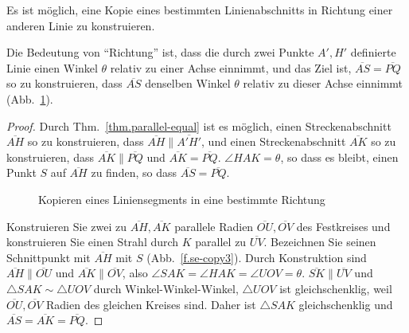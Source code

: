 \begin{theorem}\label{thm.straight-direction}
Es ist möglich, eine Kopie eines bestimmten Linienabschnitts in Richtung einer anderen Linie zu konstruieren.
\end{theorem}

Die Bedeutung von ``Richtung'' ist, dass die durch zwei Punkte $A',H'$ definierte Linie einen Winkel $\theta$ relativ zu einer Achse einnimmt, und das Ziel ist, $\overline{AS}=\overline{PQ}$ so zu konstruieren, dass $\overline{AS}$ denselben Winkel $\theta$ relativ zu dieser Achse einnimmt (Abb.~\ref{f.se-copy1}).

\begin{proof}
Durch Thm.~\ref{thm.parallel-equal} ist es möglich, einen Streckenabschnitt $\overline{AH}$ so zu konstruieren, dass $\overline{AH}\parallel\overline{A'H'}$, und einen Streckenabschnitt $\overline{AK}$ so zu konstruieren, dass $\overline{AK}\parallel\overline{PQ}$ und $\overline{AK}=\overline{PQ}$.
$\angle HAK=\theta$, so dass es bleibt, einen Punkt $S$ auf $\overline{AH}$ zu finden, so dass $\overline{AS}=\overline{PQ}$.

\begin{figure}[b]
\begin{center}
\end{center}
\caption{Kopieren eines Liniensegments in eine bestimmte Richtung}\label{f.se-copy1}
\end{figure}

Konstruieren Sie zwei zu $\overline{AH}, \overline{AK}$ parallele Radien $\overline{OU}, \overline{OV}$ des Festkreises und konstruieren Sie einen Strahl durch $K$ parallel zu $\overline{UV}$. Bezeichnen Sie seinen Schnittpunkt mit $\overline{AH}$ mit $S$ (Abb.~\ref{f.se-copy3}). Durch Konstruktion sind $\overline{AH}\parallel\overline{OU}$ und $\overline{AK}\parallel\overline{OV}$, also $\angle SAK=\angle HAK=\angle UOV=\theta$. $\overline{SK}\parallel\overline{UV}$ und $\triangle SAK\sim\triangle UOV$ durch Winkel-Winkel-Winkel, $\triangle UOV$ ist gleichschenklig, weil $\overline{OU}, \overline{OV}$ Radien des gleichen Kreises sind. Daher ist $\triangle SAK$ gleichschenklig und $\overline{AS}=\overline{AK}=\overline{PQ}$.
\end{proof}

